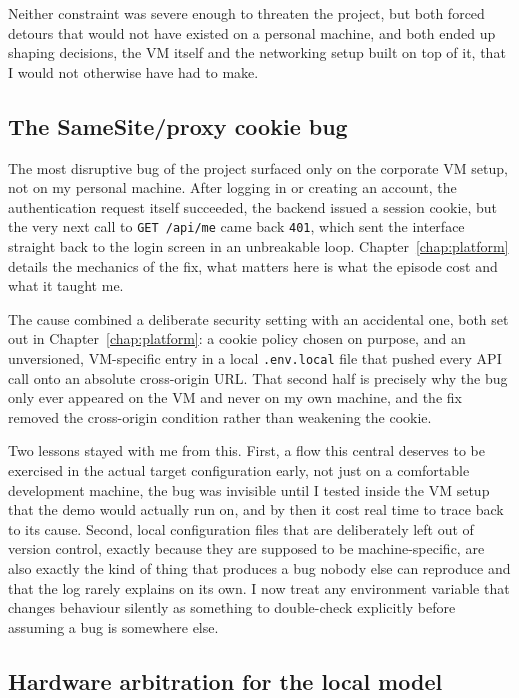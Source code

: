 Neither constraint was severe enough to threaten the project, but both forced detours that would not have existed on a personal machine, and both ended up shaping decisions, the VM itself and the networking setup built on top of it, that I would not otherwise have had to make.

\subsection{The SameSite/proxy cookie bug}
\label{sec:pm-cookie-bug}

The most disruptive bug of the project surfaced only on the corporate VM setup, not on my personal machine. After logging in or creating an account, the authentication request itself succeeded, the backend issued a session cookie, but the very next call to \texttt{GET /api/me} came back \texttt{401}, which sent the interface straight back to the login screen in an unbreakable loop. Chapter~\ref{chap:platform} details the mechanics of the fix, what matters here is what the episode cost and what it taught me.

The cause combined a deliberate security setting with an accidental one, both set out in Chapter~\ref{chap:platform}: a cookie policy chosen on purpose, and an unversioned, VM-specific entry in a local \texttt{.env.local} file that pushed every API call onto an absolute cross-origin URL. That second half is precisely why the bug only ever appeared on the VM and never on my own machine, and the fix removed the cross-origin condition rather than weakening the cookie.

Two lessons stayed with me from this. First, a flow this central deserves to be exercised in the actual target configuration early, not just on a comfortable development machine, the bug was invisible until I tested inside the VM setup that the demo would actually run on, and by then it cost real time to trace back to its cause. Second, local configuration files that are deliberately left out of version control, exactly because they are supposed to be machine-specific, are also exactly the kind of thing that produces a bug nobody else can reproduce and that the log rarely explains on its own. I now treat any environment variable that changes behaviour silently as something to double-check explicitly before assuming a bug is somewhere else.

\subsection{Hardware arbitration for the local model}
\label{sec:pm-model-arbitration}

